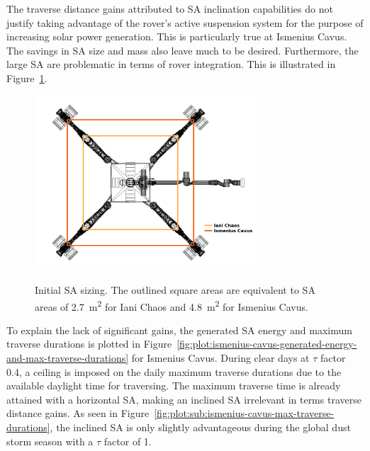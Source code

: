 \documentclass[twocolumn,letterpaper]{IEEEAerospaceCLS}  %
\newcommand{\refFig}[1]{{Figure}~\ref{#1}} %
\begin{document}
The traverse distance gains attributed to \ac{SA} inclination capabilities do not justify taking advantage of the rover's active suspension system for the purpose of increasing solar power generation. This is particularly true at Ismenius Cavus. The savings in \ac{SA} size and mass also leave much to be desired. Furthermore, the large \ac{SA} are problematic in terms of rover integration. This is illustrated in \refFig{fig:sa-area-initial-sizes}.

\begin{figure}[h]
  \centering
  \includegraphics[width=3.25in]{figures/images/sa-area-initial-sizes.png}\\
  \caption{Initial \ac{SA} sizing. The outlined square areas are equivalent to \ac{SA} areas of \SI{2.7}{m^{2}} for Iani Chaos and \SI{4.8}{m^{2}} for Ismenius Cavus.}
  \label{fig:sa-area-initial-sizes}
\end{figure}


To explain the lack of significant gains, the generated \ac{SA} energy and maximum traverse durations is plotted in \refFig{fig:plot:ismenius-cavus-generated-energy-and-max-traverse-durations} for Ismenius Cavus. During clear days at $\tau$ factor 0.4, a ceiling is imposed on the daily maximum traverse durations due to the available daylight time for traversing. The maximum traverse time is already attained with a horizontal \ac{SA}, making an inclined \ac{SA} irrelevant in terms traverse distance gains. As seen in \refFig{fig:plot:sub:ismenius-cavus-max-traverse-durations}, the inclined \ac{SA} is only slightly advantageous during the global dust storm season with a $\tau$ factor of 1.
\end{document}
